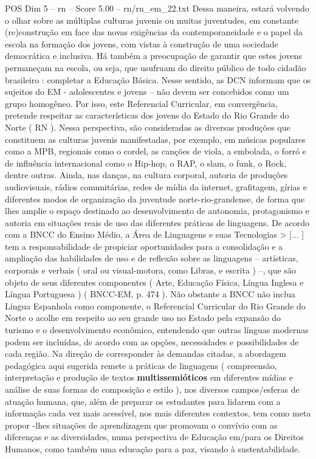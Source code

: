 \begin{textsample}{POS Dim 5 – rn – Score 5.00 – rn/rn\_em\_22.txt}
Dessa maneira, estará volvendo o olhar sobre as múltiplas culturas juvenis ou muitas juventudes, em constante (re)construção em face das novas exigências da contemporaneidade e o papel da escola na formação dos jovens, com vistas à construção de uma sociedade democrática e inclusiva.
Há também a preocupação de garantir que estes jovens permaneçam na escola, ou seja, que usufruam do direito público de todo cidadão brasileiro : completar a Educação Básica.
Nesse sentido, as DCN informam que os sujeitos do EM - adolescentes e jovens – não devem ser concebidos como um grupo homogêneo.
Por isso, este Referencial Curricular, em convergência, pretende respeitar as características dos jovens do Estado do Rio Grande do Norte ( RN ).
Nessa perspectiva, são consideradas as diversas produções que constituem as culturas juvenis manifestadas, por exemplo, em músicas populares como a MPB, regionais como o cordel, as canções de viola, a embolada, o forró e de influência internacional como o Hip-hop, o RAP, o slam, o funk, o Rock, dentre outras.
Ainda, nas danças, na cultura corporal, autoria de produções audiovisuais, rádios comunitárias, redes de mídia da internet, grafitagem, gírias e diferentes modos de organização da juventude norte-rio-grandense, de forma que lhes amplie o espaço destinado ao desenvolvimento de autonomia, protagonismo e autoria em situações reais de uso das diferentes práticas de linguagens.
De acordo com a BNCC do Ensino Médio, a Área de Linguagens e suas Tecnologias > [... ] tem a responsabilidade de propiciar oportunidades para a consolidação e a ampliação das habilidades de uso e de reflexão sobre as linguagens – artísticas, corporais e verbais ( oral ou visual-motora, como Libras, e escrita ) –, que são objeto de seus diferentes componentes ( Arte, Educação Física, Língua Inglesa e Língua Portuguesa ) ( BNCC-EM, p. 474 ).
Não obstante a BNCC não inclua Língua Espanhola como componente, o Referencial Curricular do Rio Grande do Norte o acolhe em respeito ao seu grande uso no Estado pela expansão do turismo e o desenvolvimento econômico, entendendo que outras línguas modernas podem ser incluídas, de acordo com as opções, necessidades e possibilidades de cada região.
Na direção de corresponder às demandas citadas, a abordagem pedagógica aqui sugerida remete a práticas de linguagens ( compreensão, interpretação e produção de textos \textbf{multissemióticos} em diferentes mídias e análise de suas formas de composição e estilo ), nos diversos campos/esferas de atuação humana, que, além de preparar os estudantes para lidarem com a informação cada vez mais acessível, nos mais diferentes contextos, tem como meta propor -lhes situações de aprendizagem que promovam o convívio com as diferenças e as diversidades, numa perspectiva de Educação em/para os Direitos Humanos, como também uma educação para a paz, visando à sustentabilidade.

\end{textsample}
